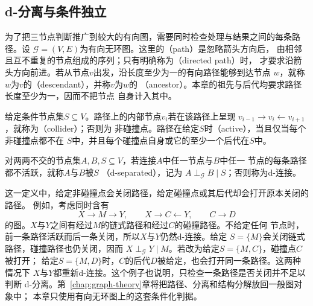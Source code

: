 \subsection{d-分离与条件独立}

为了把三节点判断推广到较大的有向图，需要同时检查处理与结果之间的每条路径。设
\(\mathcal{G}=(V,E)\)为有向无环图。这里的（path）是忽略箭头方向后，
由相邻且互不重复的节点组成的序列；只有明确称为（directed path）时，
才要求沿箭头方向前进。若从节点\(v\)出发，沿长度至少为一的有向路径能够到达节点
\(w\)，就称\(w\)为\(v\)的（descendant），并称\(v\)为\(w\)的
（ancestor）。本章的祖先与后代均要求路径长度至少为一，因而不把节点
自身计入其中。

\begin{definition}[活跃路径与d-分离]
  \label{def:causal-d-separation}
  给定条件节点集\(S\subseteq V\)。路径上的内部节点\(v_i\)若在该路径上呈现
  \(v_{i-1}\to v_i\leftarrow v_{i+1}\)，就称为（collider）；否则为
  非碰撞点。路径在给定\(S\)时（active），当且仅当每个非碰撞点都不在
  \(S\)中，并且每个碰撞点自身或它的至少一个后代在\(S\)中。

  对两两不交的节点集\(A,B,S\subseteq V\)，若连接\(A\)中任一节点与\(B\)中任一
  节点的每条路径都不活跃，就称\(A\)与\(B\)被\(S\)
  （d-separated），记为
  \(A\perp_{\mathcal{G}}B\mid S\)；否则称为d-连接。
\end{definition}

这一定义中，给定非碰撞点会关闭路径，给定碰撞点或其后代却会打开原本关闭的路径。
例如，考虑同时含有
\[
  X\to M\to Y,\qquad X\to C\leftarrow Y,\qquad C\to D
\]
的图。\(X\)与\(Y\)之间有经过\(M\)的链式路径和经过\(C\)的碰撞路径。不给定任何
节点时，前一条路径活跃而后一条关闭，所以\(X\)与\(Y\)仍然d-连接。给定
\(S=\{M\}\)会关闭链式路径，碰撞路径也仍关闭，因而
\(X\perp_{\mathcal{G}}Y\mid M\)。若改为给定\(S=\{M,C\}\)，碰撞点\(C\)被打开；
给定\(S=\{M,D\}\)时，\(C\)的后代\(D\)被给定，也会打开同一条路径。这两种情况下
\(X\)与\(Y\)都重新d-连接。这个例子也说明，只检查一条路径是否关闭并不足以判断
d-分离。第~\ref{chap:graph-theory}章将把路径、分离和结构分解放回一般图对象中；
本章只使用有向无环图上的这套条件化判据。

